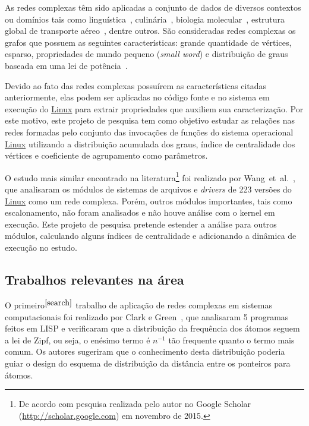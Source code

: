\documentclass[a4paper,12pt,twoside]{article}
\def\linux{\href{http://www.kernel.org/}{\sc Linux}}
\def\etal{{et~al.}}
\begin{document}
As redes complexas têm sido aplicadas a conjunto de dados de diversos
contextos ou domínios tais como linguística~\cite{cnet:thesaurus},
culinária~\cite{cnet:culinary}, biologia molecular~\cite{huber-2007},
estrutura global de transporte aéreo~\cite{guimera-2005}, dentre
outros. São consideradas redes complexas os grafos que possuem as
seguintes características: grande quantidade de vértices, esparso,
propriedades de mundo pequeno (\textit{small word}) e distribuição de
graus baseada em uma lei de potência~\cite{chung2006}.

Devido ao fato das redes complexas possuírem as características
citadas anteriormente, elas podem ser aplicadas no código fonte e no
sistema em execução do \linux{} para extrair propriedades que auxiliem
sua caracterização. Por este motivo, este projeto de pesquisa tem como
objetivo estudar as relações nas redes formadas pelo conjunto das
invocações de funções do sistema operacional \linux{} utilizando a
distribuição acumulada dos graus, índice de centralidade dos vértices
e coeficiente de agrupamento como parâmetros.

O estudo mais similar encontrado na
literatura\footnote{\label{search}De acordo com pesquisa realizada
pelo autor no Google Scholar (\url{http://scholar.google.com}) em
novembro de 2015.} foi realizado por Wang~\etal~\cite{wang2009}, que
analisaram os módulos de sistemas de arquivos e \textit{drivers} de
223 versões do \linux{} como um rede complexa. Porém, outros módulos
importantes, tais como escalonamento, não foram analisados e não houve
análise com o kernel em execução. Este projeto de pesquisa pretende
estender a análise para outros módulos, calculando alguns
índices de centralidade e adicionando a dinâmica de execução no estudo.

\subsection{Trabalhos relevantes na área}

O primeiro$^{\ref{search}}$ trabalho de aplicação de redes complexas em sistemas
computacionais foi realizado por Clark e Green~\cite{zipf:lisp}, que
analisaram 5 programas feitos em LISP e verificaram que a distribuição
da frequência dos átomos seguem a lei de Zipf, ou seja, o enésimo
termo é $n^{-1}$ tão frequente quanto o termo mais comum. Os autores
sugeriram que o conhecimento desta distribuição poderia guiar o design
do esquema de distribuição da distância entre os ponteiros para
átomos.
\end{document}
